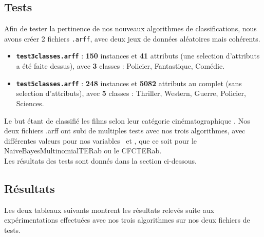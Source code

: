 \documentclass{article}
\begin{document}
\subsection{Tests}
Afin de tester la pertinence de nos nouveaux algorithmes de classifications, nous avons créer 2 fichiers \texttt{.arff}, avec deux jeux de données aléatoires mais cohérents. 
\begin{itemize}
\item \texttt{\textbf{test3classes.arff}} : \textbf{150} instances et \textbf{41} attributs (une selection d'attributs a été faite dessus), avec \textbf{3} classes : Policier, Fantastique, Comédie.
\item \texttt{\textbf{test5classes.arff}} : \textbf{248} instances et \textbf{5082} attributs au complet (sans selection d'attributs), avec \textbf{5} classes : Thriller, Western, Guerre, Policier, Sciences.
\end{itemize}
Le but étant de classifié les films selon leur catégorie cinématographique .
Nos deux fichiers .arff ont subi de multiples tests avec nos trois algorithmes, avec différentes valeurs pour nos variables \textalpha \ et \textbeta, que ce soit pour le NaiveBayesMultinomialTERab ou le CFCTERab.\\
Les résultats des tests sont donnés dans la section ci-dessous.

\subsection{Résultats}
Les deux tableaux suivants montrent les résultats relevés suite aux expérimentations effectuées avec nos trois algorithmes sur nos deux fichiers de tests.
\end{document}
